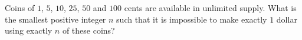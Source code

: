 Coins of $1$, $5$, $10$, $25$, $50$ and $100$ cents are available in unlimited supply. What is the smallest positive integer $n$ such that it is impossible to make exactly $1$ dollar using exactly $n$ of these coins?
